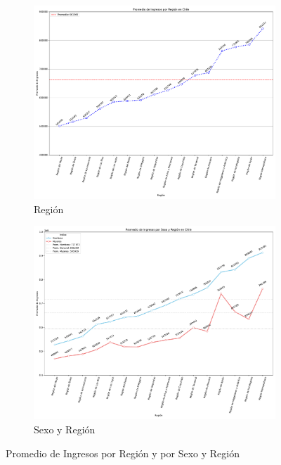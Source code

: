\documentclass{article}
\begin{document}
	\begin{figure}[htbp]
		\centering
		\begin{subfigure}[b]{0.49\textwidth}
			\centering
			\includegraphics[width=1\textwidth]{../output/fig/PromIngRegion.pdf}
			\caption{\label{7a} Región}
		\end{subfigure}
		\hfill
		\begin{subfigure}[b]{0.49\textwidth}
			\centering
			\includegraphics[width=1\textwidth]{../output/fig/PromIngSexoRegion.pdf}
			\caption{\label{7b} Sexo y Región}
		\end{subfigure}
		\caption{Promedio de Ingresos por Región y por Sexo y Región}
		\label{07fig}
	\end{figure}
	
\end{document}
